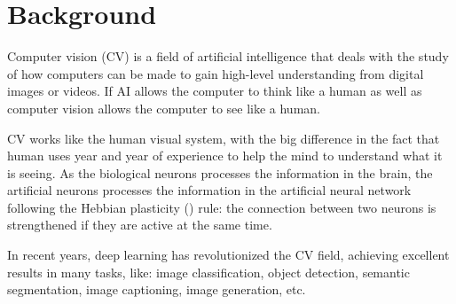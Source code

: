 \section{Background}\label{sec:background}
Computer vision (CV) is a field of artificial intelligence that deals with the study of how computers can be made to gain high-level understanding from digital images or videos.
If AI allows the computer to think like a human as well as computer vision allows the computer to see like a human.

CV works like the human visual system, with the big difference in the fact that human uses year and year of experience to help the mind to understand what it is seeing.
As the biological neurons processes the information in the brain, the artificial neurons processes the information in the artificial neural network following the Hebbian plasticity (\cite{site:hebbian-plasticity}) rule: the connection between two neurons is strengthened if they are active at the same time.

In recent years, deep learning has revolutionized the CV field, achieving excellent results in many tasks, like: image classification, object detection, semantic segmentation, image captioning, image generation, etc.

